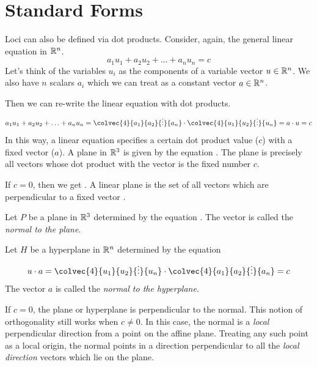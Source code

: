 \documentclass[fleqn,letterpaper]{report}
\begin{document}
\section{Standard Forms}
\label{standard-forms}

Loci can also be defined via dot products. Consider,
again, the general linear equation in $\mathbb{R}^n$.
\begin{equation*}
a_1 u_1 + a_2 u_2 + \ldots + a_n u_n = c
\end{equation*}
Let's think of the variables $u_i$ as the components of a
variable vector $u \in \mathbb{R}^n$. We also have $n$ scalars
$a_i$ which we can treat as a constant vector $a \in \mathbb{R}^n$. 

Then we can re-write the linear equation with dot products. 
\begin{equation*}
a_1 u_1 + a_2 u_2 + \ldots + a_n u_n =
\colvec{4}{a_1}{a_2}{\vdots}{a_n} \cdot
\colvec{4}{u_1}{u_2}{\vdots}{u_n} = 
a \cdot u = c
\end{equation*}
In this way, a linear equation specifies a certain dot product
value ($c$) with a fixed vector ($a$). A plane in $\mathbb{R}^3$ is
given by the equation . The plane is precisely
all vectors whose dot product with the vector  is the fixed number $c$.

If $c=0$, then we get . 
A linear plane is the set of all vectors which are
perpendicular to a fixed vector . 

\begin{defn}
Let $P$ be a plane in $\mathbb{R}^3$ determined by the equation 
. 
The vector  is
called the \emph{normal to the plane}. 

Let $H$ be a hyperplane in $\mathbb{R}^n$ determined by the equation
\begin{displaymath}
u \cdot a = \colvec{4}{u_1}{u_2}{\vdots}{u_n} \cdot
\colvec{4}{a_1}{a_2}{\vdots}{a_n} = c 
\end{displaymath} 
The vector $a$ is called the \emph{normal to the hyperplane}. 
\end{defn} 

If $c=0$, the plane or hyperplane is perpendicular to the
normal. This notion of orthogonality still works when $c
\neq 0$. In this case, the normal is a \emph{local} perpendicular
direction from a point on the affine plane. Treating any such
point as a local origin, the normal points in a direction
perpendicular to all the \emph{local direction} vectors which
lie on the plane. 
\end{document}
